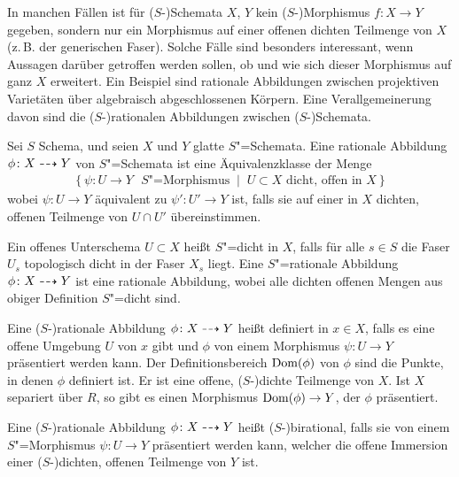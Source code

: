 In manchen Fällen ist für ($S$-)Schemata $X$, $Y$ kein
($S$-)Morphismus $f\colon X\to Y$ gegeben, sondern nur ein Morphismus
auf einer offenen dichten Teilmenge von $X$ (z.\,B. der generischen
Faser). Solche Fälle sind besonders interessant, wenn Aussagen
darüber getroffen werden sollen, ob und wie sich dieser Morphismus auf
ganz $X$ erweitert. Ein Beispiel sind rationale Abbildungen zwischen
projektiven Varietäten über algebraisch abgeschlossenen Körpern.
Eine Verallgemeinerung davon sind die ($S$-)rationalen Abbildungen
zwischen ($S$-)Schemata.
\begin{Definition}\label{def:ratabb}
  Sei $S$ Schema, und seien $X$ und $Y$ glatte $S$"=Schemata.
  Eine rationale Abbildung $\phi\colon X\dashrightarrow Y$ von
  $S$"=Schemata ist eine Äquivalenzklasse der Menge
  \begin{gather*}
    \left\{
      \psi\colon U\to Y \text{ $S$"=Morphismus}
      \;\middle|\;
      U\subset X \text{ dicht, offen in $X$}
    \right\}
  \end{gather*}
  wobei $\psi\colon U\to Y$ äquivalent zu $\psi'\colon U'\to Y$ ist,
  falls sie auf einer in $X$ dichten, offenen Teilmenge von $U\cap U'$
  übereinstimmen.
  
  Ein offenes Unterschema $U\subset X$ heißt $S$"=dicht in $X$,
  falls für alle $s\in S$ die Faser $U_s$ %
  topologisch dicht in der Faser $X_s$ %
  liegt.
  Eine $S$"=rationale Abbildung $\phi\colon X\dashrightarrow Y$ ist eine
  rationale Abbildung, wobei alle dichten offenen Mengen aus obiger
  Definition $S$"=dicht sind.

  Eine ($S$-)rationale Abbildung $\phi\colon X\dashrightarrow Y$ heißt definiert
  in $x\in X$, falls es eine offene Umgebung $U$ von $x$ gibt und
  $\phi$ von einem Morphismus $\psi\colon U\to Y$ präsentiert werden
  kann.
  Der Definitionsbereich $\operatorname{Dom}(\phi)$ von $\phi$ sind die
  Punkte, in denen $\phi$ definiert ist. Er ist eine offene,
  ($S$-)dichte Teilmenge von $X$. Ist $X$ separiert über $R$, so gibt
  es einen Morphismus $\operatorname{Dom}(\phi)\to Y$, der $\phi$ präsentiert.
  
  Eine ($S$-)rationale Abbildung $\phi\colon X\dashrightarrow Y$ heißt
  ($S$-)birational, falls sie von einem $S$"=Morphismus
  ${\psi\colon U\to Y}$ präsentiert werden kann, welcher die offene
  Immersion einer ($S$-)dichten, offenen Teilmenge von $Y$ ist.
\end{Definition}

